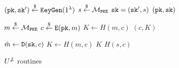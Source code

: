 \documentclass{article}
\begin{document}
\begin{figure}[H]
    \center
    \begin{minipage}{0.33\textwidth}
        \begin{algorithm}[H]
            \caption{$\keygen^{\not\bot}$}\label{alg:u-notbot-keygen}
            \begin{algorithmic}[1]
                \State $(\texttt{pk}, \texttt{sk}^\prime) \stackrel{\$}{\leftarrow} \texttt{KeyGen}(1^\lambda)$
                \State $s \stackrel{\$}{\leftarrow} \mathcal{M}_\texttt{PKE}$
                \State $\texttt{sk} = (\texttt{sk}^\prime, s)$
                \State \Return $(\texttt{pk}, \texttt{sk})$
            \end{algorithmic}
        \end{algorithm}
    \end{minipage}
    \hfill
    \begin{minipage}{0.33\textwidth}
        \begin{algorithm}[H]
            \caption{$\encap^{\not\bot}(\pk)$}\label{alg:u-notbot-encap}
            \begin{algorithmic}[1]
                \State $m \stackrel{\$}{\leftarrow} \mathcal{M}_\texttt{PKE}$
                \State $c \stackrel{\$}{\leftarrow} \texttt{E}(\texttt{pk}, m)$
                \State $K \leftarrow H(m, c)$
                \State \Return $(c, K)$
            \end{algorithmic}
        \end{algorithm}
    \end{minipage}
    \hfill
    \begin{minipage}{0.32\textwidth}
        \begin{algorithm}[H]
            \caption{$\decap^{\not\bot}(\sk, c)$}\label{alg:u-notbot-decap}
            \begin{algorithmic}[1]
                \State $\hat{m} \leftarrow \texttt{D}(\texttt{sk}, c)$
                    \State $K \leftarrow H(\hat{m}, c)$
                    \State \Return $K$
                \EndIf
                \State \Return $H(s, c)$
            \end{algorithmic}
        \end{algorithm}
    \end{minipage}
    \caption{$U^{\not\bot}$ routines}
\end{figure}
\end{document}
